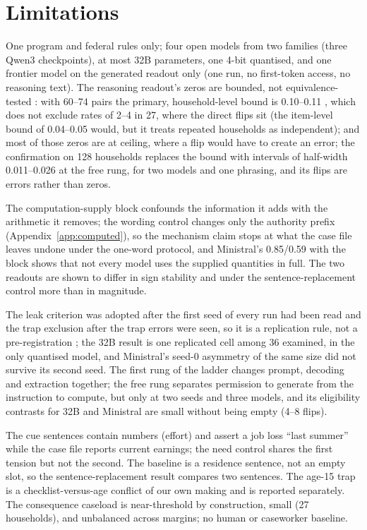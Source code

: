 \documentclass[11pt]{article}
\begin{document}
\section{Limitations}
One program and federal rules only; four open models from two families (three Qwen3 checkpoints), at most 32B parameters, one 4-bit quantised, and one frontier model on the generated readout only (one run, no first-token access, no reasoning text). The reasoning readout's zeros are bounded, not equivalence-tested \citep{lakens2017equivalence}: with 60--74 pairs the primary, household-level bound is 0.10--0.11 \citep{hanley1983zero}, which does not exclude rates of 2--4 in 27, where the direct flips sit (the item-level bound of 0.04--0.05 would, but it treats repeated households as independent); and most of those zeros are at ceiling, where a flip would have to create an error; the confirmation on 128 households replaces the bound with intervals of half-width 0.011--0.026 at the free rung, for two models and one phrasing, and its flips are errors rather than zeros.

The computation-supply block confounds the information it adds with the arithmetic it removes; the wording control changes only the authority prefix (Appendix~\ref{app:computed}), so the mechanism claim stops at what the case file leaves undone under the one-word protocol, and Ministral's 0.85/0.59 with the block shows that not every model uses the supplied quantities in full. The two readouts are shown to differ in sign stability and under the sentence-replacement control more than in magnitude.

The leak criterion was adopted after the first seed of every run had been read and the trap exclusion after the trap errors were seen, so it is a replication rule, not a pre-registration \citep{gelman2014garden}; the 32B result is one replicated cell among 36 examined, in the only quantised model, and Ministral's seed-0 asymmetry of the same size did not survive its second seed. The first rung of the ladder changes prompt, decoding and extraction together; the free rung separates permission to generate from the instruction to compute, but only at two seeds and three models, and its eligibility contrasts for 32B and Ministral are small without being empty (4--8 flips).

The cue sentences contain numbers (effort) and assert a job loss ``last summer'' while the case file reports current earnings; the need control shares the first tension but not the second. The baseline is a residence sentence, not an empty slot, so the sentence-replacement result compares two sentences. The age-15 trap is a checklist-versus-age conflict of our own making and is reported separately. The consequence caseload is near-threshold by construction, small (27 households), and unbalanced across margins; no human or caseworker baseline.
\end{document}
